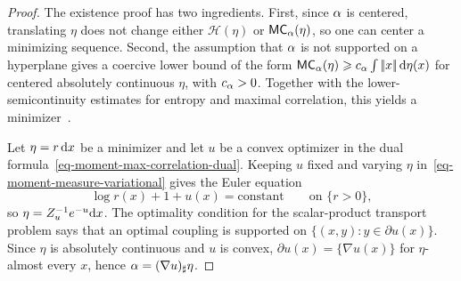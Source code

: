 \begin{proof}
	The existence proof has two ingredients. First, since $\alpha$ is centered, translating $\eta$ does not change either $\mathcal H(\eta)$ or $\mathsf{MC}_\alpha(\eta)$, so one can center a minimizing sequence. Second, the assumption that $\alpha$ is not supported on a hyperplane gives a coercive lower bound of the form $\mathsf{MC}_\alpha(\eta)\geqslant c_\alpha\int|\!| x |\!|\,\mathrm{d}\eta(x)$ for centered absolutely continuous $\eta$, with $c_\alpha>0$. Together with the lower-semicontinuity estimates for entropy and maximal correlation, this yields a minimizer~\cite{Santambrogio2015MomentMeasures}.

	Let $\eta=r\,\mathrm{d} x$ be a minimizer and let $u$ be a convex optimizer in the dual formula~\eqref{eq-moment-max-correlation-dual}. Keeping $u$ fixed and varying $\eta$ in~\eqref{eq-moment-measure-variational} gives the Euler equation
	\[
		\log r(x)+1+u(x)=\mathrm{constant}
		\qquad\text{on }\{r>0\},
	\]
	so $\eta=Z_u^{-1}e^{-u}\mathrm{d} x$. The optimality condition for the scalar-product transport problem says that an optimal coupling is supported on $\{(x,y):y\in\partial u(x)\}$. Since $\eta$ is absolutely continuous and $u$ is convex, $\partial u(x)=\{\nabla u(x)\}$ for $\eta$-almost every $x$, hence $\alpha=(\nabla u)_\sharp\eta$.


\end{proof}
